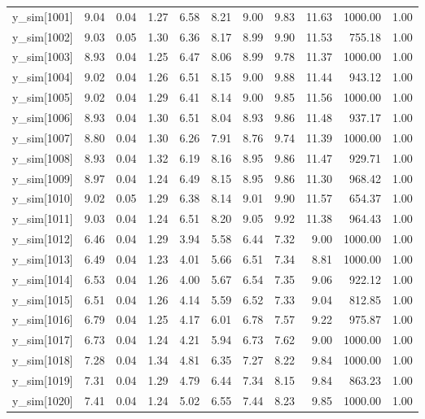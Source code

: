 \begin{table}[ht]
\begin{tabular}{rrrrrrrrrrr}
  y\_sim[1001] & 9.04 & 0.04 & 1.27 & 6.58 & 8.21 & 9.00 & 9.83 & 11.63 & 1000.00 & 1.00 \\ 
  y\_sim[1002] & 9.03 & 0.05 & 1.30 & 6.36 & 8.17 & 8.99 & 9.90 & 11.53 & 755.18 & 1.00 \\ 
  y\_sim[1003] & 8.93 & 0.04 & 1.25 & 6.47 & 8.06 & 8.99 & 9.78 & 11.37 & 1000.00 & 1.00 \\ 
  y\_sim[1004] & 9.02 & 0.04 & 1.26 & 6.51 & 8.15 & 9.00 & 9.88 & 11.44 & 943.12 & 1.00 \\ 
  y\_sim[1005] & 9.02 & 0.04 & 1.29 & 6.41 & 8.14 & 9.00 & 9.85 & 11.56 & 1000.00 & 1.00 \\ 
  y\_sim[1006] & 8.93 & 0.04 & 1.30 & 6.51 & 8.04 & 8.93 & 9.86 & 11.48 & 937.17 & 1.00 \\ 
  y\_sim[1007] & 8.80 & 0.04 & 1.30 & 6.26 & 7.91 & 8.76 & 9.74 & 11.39 & 1000.00 & 1.00 \\ 
  y\_sim[1008] & 8.93 & 0.04 & 1.32 & 6.19 & 8.16 & 8.95 & 9.86 & 11.47 & 929.71 & 1.00 \\ 
  y\_sim[1009] & 8.97 & 0.04 & 1.24 & 6.49 & 8.15 & 8.95 & 9.86 & 11.30 & 968.42 & 1.00 \\ 
  y\_sim[1010] & 9.02 & 0.05 & 1.29 & 6.38 & 8.14 & 9.01 & 9.90 & 11.57 & 654.37 & 1.00 \\ 
  y\_sim[1011] & 9.03 & 0.04 & 1.24 & 6.51 & 8.20 & 9.05 & 9.92 & 11.38 & 964.43 & 1.00 \\ 
  y\_sim[1012] & 6.46 & 0.04 & 1.29 & 3.94 & 5.58 & 6.44 & 7.32 & 9.00 & 1000.00 & 1.00 \\ 
  y\_sim[1013] & 6.49 & 0.04 & 1.23 & 4.01 & 5.66 & 6.51 & 7.34 & 8.81 & 1000.00 & 1.00 \\ 
  y\_sim[1014] & 6.53 & 0.04 & 1.26 & 4.00 & 5.67 & 6.54 & 7.35 & 9.06 & 922.12 & 1.00 \\ 
  y\_sim[1015] & 6.51 & 0.04 & 1.26 & 4.14 & 5.59 & 6.52 & 7.33 & 9.04 & 812.85 & 1.00 \\ 
  y\_sim[1016] & 6.79 & 0.04 & 1.25 & 4.17 & 6.01 & 6.78 & 7.57 & 9.22 & 975.87 & 1.00 \\ 
  y\_sim[1017] & 6.73 & 0.04 & 1.24 & 4.21 & 5.94 & 6.73 & 7.62 & 9.00 & 1000.00 & 1.00 \\ 
  y\_sim[1018] & 7.28 & 0.04 & 1.34 & 4.81 & 6.35 & 7.27 & 8.22 & 9.84 & 1000.00 & 1.00 \\ 
  y\_sim[1019] & 7.31 & 0.04 & 1.29 & 4.79 & 6.44 & 7.34 & 8.15 & 9.84 & 863.23 & 1.00 \\ 
  y\_sim[1020] & 7.41 & 0.04 & 1.24 & 5.02 & 6.55 & 7.44 & 8.23 & 9.85 & 1000.00 & 1.00 \\ 

\end{tabular}
\end{table}
